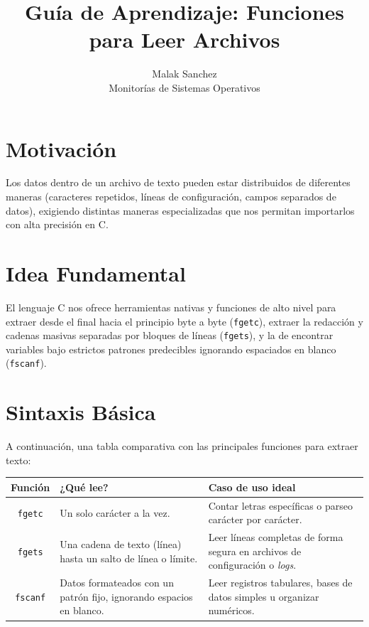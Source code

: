 \documentclass[12pt,a4paper]{article}
\title{\textbf{Guía de Aprendizaje: Funciones para Leer Archivos}}
\author{Malak Sanchez \\ \small Monitorías de Sistemas Operativos}
\date{}
\begin{document}
\maketitle

\section{Motivación}
Los datos dentro de un archivo de texto pueden estar distribuidos de diferentes maneras (caracteres repetidos, líneas de configuración, campos separados de datos), exigiendo distintas maneras especializadas que nos permitan importarlos con alta precisión en C.

\section{Idea Fundamental}
El lenguaje C nos ofrece herramientas nativas y funciones de alto nivel para extraer desde el final hacia el principio byte a byte (\texttt{fgetc}), extraer la redacción y cadenas masivas separadas por bloques de líneas (\texttt{fgets}), y la de encontrar variables bajo estrictos patrones predecibles ignorando espaciados en blanco (\texttt{fscanf}).

\section{Sintaxis Básica}
A continuación, una tabla comparativa con las principales funciones para extraer texto:

\begin{center}
\renewcommand{\arraystretch}{1.5}
\begin{tabular}{|c|p{4cm}|p{6.5cm}|}
\hline
\textbf{Función} & \textbf{¿Qué lee?} & \textbf{Caso de uso ideal} \\ \hline
\texttt{fgetc} & Un solo carácter a la vez. & Contar letras específicas o parseo carácter por carácter. \\ \hline
\texttt{fgets} & Una cadena de texto (línea) hasta un salto de línea o límite. & Leer líneas completas de forma segura en archivos de configuración o \textit{logs}. \\ \hline
\texttt{fscanf} & Datos formateados con un patrón fijo, ignorando espacios en blanco. & Leer registros tabulares, bases de datos simples u organizar numéricos. \\ \hline
\end{tabular}
\end{center}
\end{document}
